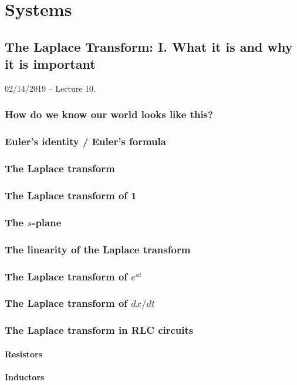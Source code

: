 \documentclass[11pt]{book}
\begin{document}
\part{Systems}



\chapter{The Laplace Transform: I. What it is and why it is important}
02/14/2019 – Lecture 10. 
\section{How do we know our world looks like this?}
\section{Euler's identity / Euler's formula}
\section{The Laplace transform}
\section{The Laplace transform of 1}
\section{The $s$-plane}
\section{The linearity of the Laplace transform}
\section{The Laplace transform of $e^{at}$}
\section{The Laplace transform of $dx/dt$}
\section{The Laplace transform in RLC circuits}
\subsection{Resistors}
\subsection{Inductors}
\end{document}
